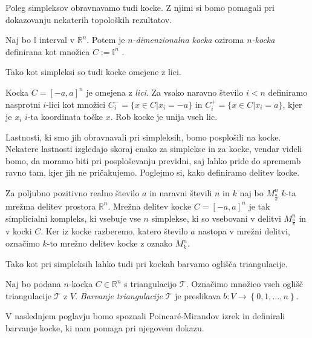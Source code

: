 \documentclass[mat1]{fmfdelo}
\newcommand{\R}{\mathbb R}
\newcommand{\I}{\mathbb I}
\newcommand{\0}{0}
\newcommand{\pT}{\mathcal T}
\begin{document}
Poleg simpleksov obravnavamo tudi kocke. Z njimi si bomo pomagali pri dokazovanju nekaterih topoloških rezultatov. 
\begin{definicija}
Naj  bo $\I$ interval v $\R^n$. Potem je \emph{$n$-dimenzionalna kocka} oziroma \emph{$n$-kocka} definirana kot množica $C := \I^n$ . 
\end{definicija}
Tako kot simpleksi so tudi kocke omejene z lici.
\begin{definicija}
Kocka $C = [-a, a]^n$ je omejena z \emph{lici}. Za vsako naravno število $i < n$ definiramo nasprotni $i$-lici kot množici
$C_i^- = \{x \in C | x_i = -a \}$ in  $C_i^+ = \{x \in C | x_i = a\}$, kjer je $x_i$ $i$-ta koordinata točke $x$. Rob  kocke je unija vseh lic.
\end{definicija}
Lastnosti, ki smo jih obravnavali pri simpleksih, bomo posplošili na kocke. Nekatere lastnosti izgledajo skoraj enako za simplekse in za kocke, vendar videli bomo, da moramo biti pri posploševanju previdni, saj lahko pride do sprememb ravno tam, kjer jih ne pričakujemo.
Poglejmo si, kako definiramo delitev kocke.
\begin{definicija}
Za poljubno pozitivno realno število $a$ in naravni števili $n$ in $k$ naj bo $M_{\frac{a}{k}}^n$  $k$-ta mrežma delitev prostora $\R^n$. Mrežna delitev kocke $C = [-a, a]^n$ je tak simplicialni kompleks, ki vsebuje vse $n$ simplekse, ki so vsebovani v delitvi $M_{\frac{a}{k}}^n$ in v kocki $C$. Ker iz kocke razberemo, katero število $a$ nastopa v mrežni delitvi, označimo $k$-to mrežno delitev kocke z oznako $M_k^n$.
\end{definicija}

Tako kot pri simpleksih lahko tudi pri kockah barvamo oglišča triangulacije.
\begin{definicija}
Naj bo podana $n$-kocka $C \in \R^n$ s triangulacijo $\pT$. Označimo množico vseh oglišč triangulacije $\pT$ z $V$. \emph{Barvanje triangulacije} $\pT$ je preslikava $b : V \to \left \{0, 1, \dots, n \right \}$.
\end{definicija}
V naslednjem poglavju bomo spoznali Poincar\'e-Mirandov izrek in definirali barvanje kocke, ki nam pomaga pri njegovem dokazu.
%
\end{document}
